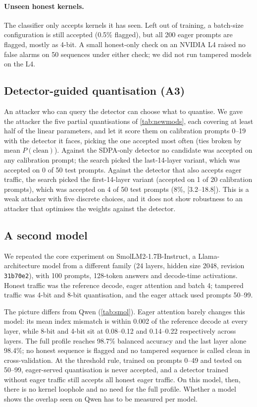 \documentclass[10pt,twocolumn]{article}
\newcommand{\ci}[2]{{\scriptsize[#1--#2]}}
\begin{document}
\paragraph{Unseen honest kernels.}
The classifier only accepts kernels it has seen.
Left out of training, a batch-size configuration is still accepted (0.5\% flagged), but all 200 eager prompts are flagged, mostly as 4-bit.
A small honest-only check on an NVIDIA L4 raised no false alarms on 50 sequences under either check; we did not run tampered models on the L4.

\subsection{Detector-guided quantisation (A3)}
\label{sec:res-aware}

An attacker who can query the detector can choose what to quantise.
We gave the attacker the five partial quantisations of \cref{tab:newmods}, each covering at least half of the linear parameters, and let it score them on calibration prompts 0--19 with the detector it faces, picking the one accepted most often (ties broken by mean $P(\text{clean})$).
Against the SDPA-only detector no candidate was accepted on any calibration prompt; the search picked the last-14-layer variant, which was accepted on 0 of 50 test prompts.
Against the detector that also accepts eager traffic, the search picked the first-14-layer variant (accepted on 1 of 20 calibration prompts), which was accepted on 4 of 50 test prompts (8\%, \ci{3.2}{18.8}).
This is a weak attacker with five discrete choices, and it does not show robustness to an attacker that optimises the weights against the detector.


\subsection{A second model}
\label{sec:res-smol}

We repeated the core experiment on SmolLM2-1.7B-Instruct, a Llama-architecture model from a different family (24 layers, hidden size 2048, revision \texttt{31b70e2}), with 100 prompts, 128-token answers and decode-time activations.
Honest traffic was the reference decode, eager attention and batch 4; tampered traffic was 4-bit and 8-bit quantisation, and the eager attack used prompts 50--99.

The picture differs from Qwen (\cref{tab:smol}).
Eager attention barely changes this model: its mean index mismatch is within 0.002 of the reference decode at every layer, while 8-bit and 4-bit sit at 0.08--0.12 and 0.14--0.22 respectively across layers.
The full profile reaches 98.7\% balanced accuracy and the last layer alone 98.4\%; no honest sequence is flagged and no tampered sequence is called clean in cross-validation.
At the threshold rule, trained on prompts 0--49 and tested on 50--99, eager-served quantisation is never accepted, and a detector trained without eager traffic still accepts all honest eager traffic.
On this model, then, there is no kernel loophole and no need for the full profile.
Whether a model shows the overlap seen on Qwen has to be measured per model.
\end{document}
